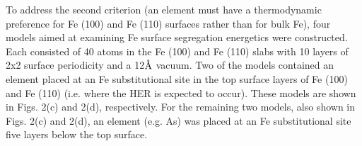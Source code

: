 To address the second criterion (an element must have a thermodynamic preference for Fe (100) and Fe (110) surfaces rather than for bulk Fe), four models aimed at examining Fe surface segregation energetics were constructed. Each consisted of 40 atoms in the Fe (100) and Fe (110) slabs with 10 layers of 2x2 surface periodicity and a 12$\mbox{\normalfont\AA}$ vacuum.  Two of the models contained an element placed at an Fe substitutional site in the top surface layers of Fe (100) and Fe (110) (i.e. where the \ac{HER} is expected to occur). These models are shown in Figs. 2(c) and 2(d), respectively. For the remaining two models, also shown in Figs. 2(c) and 2(d), an element (e.g. As) was placed at an Fe substitutional site five layers below the top surface.


\newpage
\begingroup
\begin{figure}[!ht]
  \centering
  \label{Chap:Mg_H:fig:5a}
  \label{Chap:Mg_H:fig:5b}
  \\
  \label{Chap:Mg_H:fig:5c}
  \label{Chap:Mg_H:fig:5d}

\end{figure}
